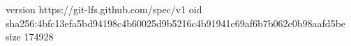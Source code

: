 version https://git-lfs.github.com/spec/v1
oid sha256:4bfc13efa5bd94198c4b60025d9b5216c4b91941c69af6b7b062c0b98aafd5be
size 174928
